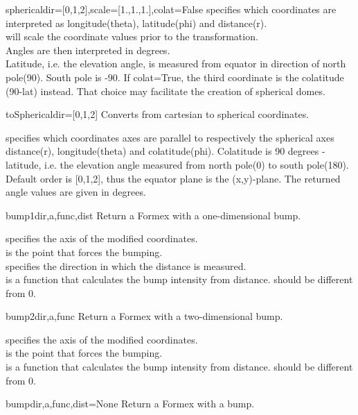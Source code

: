 {{\begin{methoddesc}{spherical}{dir=[0,1,2],scale=[1.,1.,1.],colat=False}
 specifies which coordinates are interpreted as longitude(theta), latitude(phi) and distance(r).\\
 will scale the coordinate values prior to the transformation.\\
Angles are then interpreted in degrees.\\
Latitude, i.e. the elevation angle, is measured from equator in
direction of north pole(90). South pole is -90.
If colat=True, the third coordinate is the colatitude (90-lat) instead.
That choice may facilitate the creation of spherical domes.
\end{methoddesc}

\begin{methoddesc}{toSpherical}{dir=[0,1,2]}
Converts from cartesian to spherical coordinates.

 specifies which coordinates axes are parallel to respectively the spherical axes distance(r), longitude(theta) and colatitude(phi). Colatitude is 90 degrees - latitude, i.e. the elevation angle measured from north pole(0) to south pole(180). Default order is [0,1,2], thus the equator plane is the (x,y)-plane. The returned angle values are given in degrees.
\end{methoddesc}

\begin{methoddesc}{bump1}{dir,a,func,dist}
Return a Formex with a one-dimensional bump.

 specifies the axis of the modified coordinates.\\
 is the point that forces the bumping.\\
 specifies the direction in which the distance is measured.\\
 is a function that calculates the bump intensity from distance.  should be different from 0.
\end{methoddesc}

\begin{methoddesc}{bump2}{dir,a,func}
Return a Formex with a two-dimensional bump.

 specifies the axis of the modified coordinates.\\
 is the point that forces the bumping.\\
 is a function that calculates the bump intensity from distance.  should be different from 0.
\end{methoddesc}

\begin{methoddesc}{bump}{dir,a,func,dist=None}
Return a Formex with a bump.


\end{methoddesc}}}
